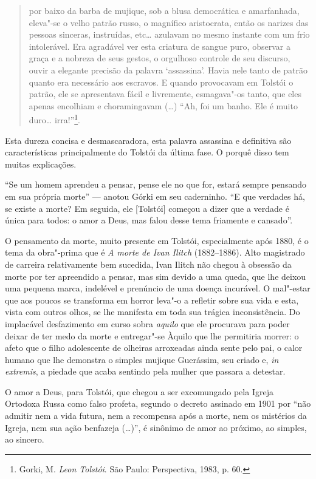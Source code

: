 {{\begin{quote}
por baixo da barba de
mujique, sob a blusa democrática e amarfanhada, eleva"-se o velho patrão
russo, o magnífico aristocrata, então os narizes das pessoas sinceras,
instruídas, etc\ldots{} azulavam no mesmo instante com um frio intolerável.
Era agradável ver esta criatura de sangue puro, observar a graça e a
nobreza de seus gestos, o orgulhoso controle de seu discurso, ouvir a
elegante precisão da palavra `assassina'. Havia nele tanto de patrão
quanto era necessário aos escravos. E quando provocavam em Tolstói o
patrão, ele se apresentava fácil e livremente, esmagava"-os tanto, que
eles apenas encolhiam e choramingavam (\ldots{}) ``Ah, foi um banho. Ele é
muito duro\ldots{} irra!''\footnote{Gorki, M. \emph{Leon Tolstói}. São Paulo: Perspectiva, 1983, p. 60.}.
\end{quote}

Esta dureza concisa e desmascaradora, esta palavra
assassina e definitiva são características principalmente do Tolstói
da última fase. O porquê disso tem muitas explicações.

``Se um homem aprendeu a pensar, pense ele no que
for, estará sempre pensando em sua própria morte'' --- anotou Górki em
seu caderninho. ``E que verdades há, se existe a morte? Em seguida,
ele [Tolstói] começou a dizer que a verdade é única para todos: o
amor a Deus, mas falou desse tema friamente e cansado''.

O pensamento da morte, muito presente em Tolstói, especialmente após
1880, é o tema da obra"-prima que é \emph{A morte de Ivan Ilitch} (1882--1886). Alto magistrado de carreira relativamente bem
sucedida, Ivan Ilitch não chegou à obsessão da morte
por ter apreendido a pensar, mas sim devido a uma queda, que lhe
deixou uma pequena marca, indelével e prenúncio de uma doença
incurável. O mal"-estar que aos poucos se transforma em horror leva"-o a
refletir sobre sua vida e esta, vista com outros olhos, se
lhe manifesta em toda sua trágica inconsistência. Do
implacável desfazimento em curso sobra \emph{aquilo} que ele procurava
para poder deixar de ter medo da morte e entregar"-se Àquilo que lhe
permitiria morrer: o afeto que o filho adolescente de olheiras
arroxeadas ainda sente pelo pai, o calor humano que lhe demonstra o
simples mujique Guerássim, seu criado e, \emph{in extremis}, a
piedade que acaba sentindo pela mulher que passara a detestar.

O amor a Deus, para Tolstói, que chegou a ser excomungado pela
Igreja Ortodoxa Russa como falso profeta, segundo o decreto assinado
em 1901 por ``não admitir nem a vida futura, nem a recompensa após a
morte, nem os mistérios da Igreja, nem sua ação benfazeja (\ldots{})'', é
sinônimo de amor ao próximo, ao simples, ao sincero.

}}
